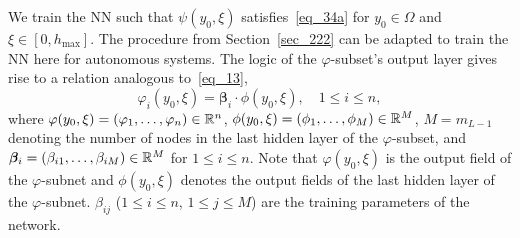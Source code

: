 
We train the NN such that $\psi(y_0,\xi)$
satisfies~\eqref{eq_34a}
for $y_0\in\Omega$ and $\xi\in[0,h_{\max}]$.
The procedure from Section~\ref{sec_222}  can be
adapted to train the NN here  for autonomous
systems.
The logic of the $\varphi$-subset's output layer gives rise to
a relation analogous to~\eqref{eq_13},
\begin{equation}\label{eq_37}
  \varphi_i(y_0,\xi) = \bm\beta_i\cdot\phi(y_0,\xi), \quad
  1\leqslant i\leqslant n,
\end{equation}
where $\varphi(y_0,\xi)=(\varphi_1,\dots,\varphi_n)\in\mathbb{R}^n$,
$\phi(y_0,\xi)=(\phi_1,\dots,\phi_M)\in\mathbb{R}^M$,
$M=m_{L-1}$ denoting the number of nodes in the last hidden layer
of the $\varphi$-subset, and
$\bm\beta_i = (\beta_{i1},\dots,\beta_{iM})\in\mathbb{R}^M$
for $1\leqslant i\leqslant n$.
Note that $\varphi(y_0,\xi)$ is the output field of
the $\varphi$-subnet and $\phi(y_0,\xi)$ denotes
the output fields of the last hidden layer of the
$\varphi$-subnet. $\beta_{ij}$ ($1\leqslant i\leqslant n$,
$1\leqslant j\leqslant M$) are the training parameters of the network.


